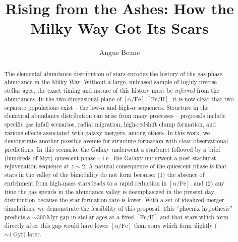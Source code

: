 \documentclass[linenumbers, twocolumn]{aastex631}
\newcommand{\Gyr}{\ensuremath{\textrm{Gyr}}}
\newcommand{\Myr}{\ensuremath{\textrm{Myr}}}
\newcommand{\FeH}{\ensuremath{[\textrm{Fe}/\textrm{H}]}}
\newcommand{\alphaFe}{\ensuremath{[\alpha/\textrm{Fe}]}}
\begin{document}
\title{Rising from the Ashes: How the Milky Way Got Its Scars}

\author{Angus Beane}



\begin{abstract}
    The elemental abundance distribution of stars encodes the history of the gas-phase abundance in the Milky Way. Without a large, unbiased sample of highly precise stellar ages, the exact timing and nature of this history must be \textit{inferred} from the abundances. In the two-dimensional plane of \alphaFe-\FeH, it is now clear that two separate populations exist -- the low-$\alpha$ and high-$\alpha$ sequences. Structure in the elemental abundance distribution can arise from many processes -- proposals include specific gas infall scenarios, radial migration, high-redshift clump formation, and various effects associated with galaxy mergers, among others. In this work, we demonstrate another possible avenue for structure formation with clear observational predictions. In this scenario, the Galaxy underwent a starburst followed by a brief (hundreds of Myr) quiescent phase -- i.e., the Galaxy underwent a post-starburst rejuvenation sequence at $z\sim2$. A natural consequence of the quiescent phase is that stars in the valley of the bimodality do not form because: (1) the absence of enrichment from high-mass stars leads to a rapid reduction in \alphaFe{}, and (2) any time the gas spends in the abundance valley is deemphasized in the present day distribution because the star formation rate is lower. With a set of idealized merger simulations, we demonstrate the feasibility of this proposal. This ``phoenix hypothesis'' predicts a $\sim300\,\Myr$ gap in stellar ages at a fixed \FeH{} and that stars which form directly after this gap would have lower \alphaFe{} than stars which form slightly ($\sim1\,\Gyr$) later.
  \end{abstract}
  
\end{document}
